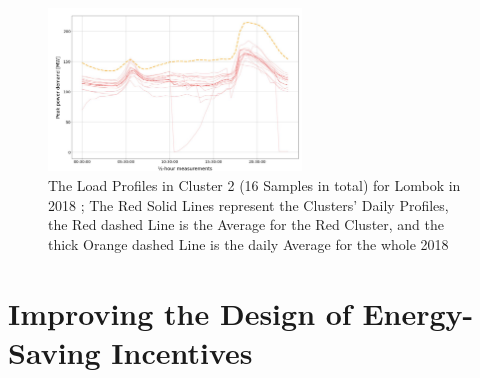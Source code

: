 \begin{figure}
    \centering
    \includegraphics[width=0.6\textwidth]{figures/jessen_ndImpactedClusters/jessen_ClusterTwo2018.png}
    \caption{The Load Profiles in Cluster 2 (16 Samples in total) for Lombok in 2018 \cite{JES-IND};
    The Red Solid Lines represent the Clusters' Daily Profiles, the Red dashed Line is the Average for the Red Cluster, and the thick Orange dashed Line is the daily Average for the whole 2018}
    \label{fig:clustering_results_2018_cluster_two}
\end{figure}

\section{Improving the Design of Energy-Saving Incentives}
\label{sec:improving_the_design_of_energy_saving_incentives}



